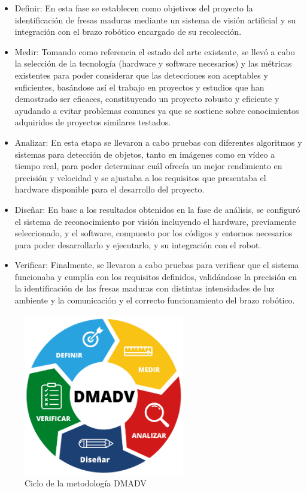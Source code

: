 \begin{itemize}
  \item Definir: En esta fase se establecen como objetivos del proyecto la identificación de fresas maduras mediante un sistema de visión artificial y su integración con el brazo robótico encargado de su recolección. 
  \item Medir: Tomando como referencia el estado del arte existente, se llevó a cabo la selección de la tecnología (hardware y software necesarios) y las métricas existentes para poder considerar que las detecciones son aceptables y suficientes, basándose así el trabajo en proyectos y estudios que han demostrado ser eficaces, constituyendo un proyecto robusto y eficiente y ayudando a evitar problemas comunes ya que se sostiene sobre conocimientos adquiridos de proyectos similares testados. 
  \item Analizar: En esta etapa se llevaron a cabo pruebas con diferentes algoritmos y sistemas para detección de objetos, tanto en imágenes como en vídeo a tiempo real, para poder determinar cuál ofrecía un mejor rendimiento en precisión y velocidad y se ajustaba a los requisitos que presentaba el hardware disponible para el desarrollo del proyecto.  
  \item Diseñar: En base a los resultados obtenidos en la fase de análisis, se configuró el sistema de reconocimiento por visión incluyendo el hardware, previamente seleccionado, y el software, compuesto por los códigos y entornos necesarios para poder desarrollarlo y ejecutarlo, y su integración con el robot.
  \item Verificar: Finalmente, se llevaron a cabo pruebas para verificar que el sistema funcionaba y cumplía con los requisitos definidos, validándose la precisión en la identificación de las fresas maduras con distintas intensidades de luz ambiente y la comunicación y el correcto funcionamiento del brazo robótico.
\end{itemize}
  
\begin{figure} [H]
    \begin{center}
      \includegraphics[width=7cm]{figs/DMADV.png}
    \end{center}
    \caption{Ciclo de la metodología DMADV}
    \label{fig:DMADV}
\end{figure}
\pagebreak
	
